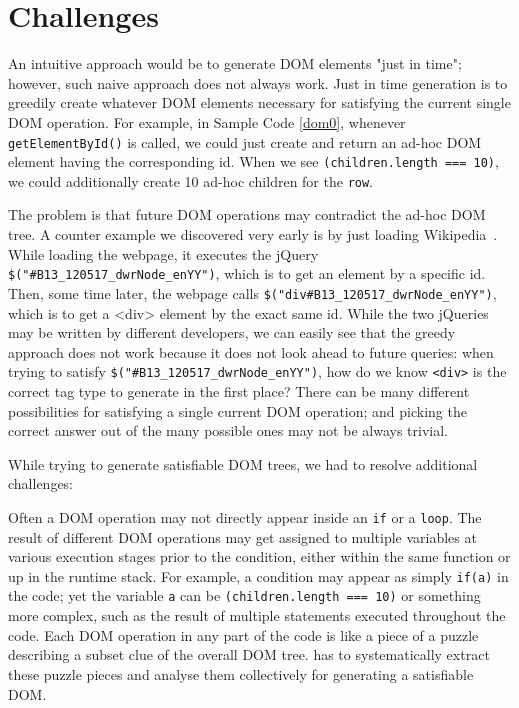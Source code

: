 \section{Challenges}
An intuitive approach would be to generate DOM elements "just in time"; however, such naive approach does not always work.  
Just in time generation is to greedily create whatever DOM elements necessary for satisfying the current single DOM operation.  
For example, in Sample Code \ref{dom0}, whenever {\tt getElementById()} is called, we could just create and return an ad-hoc DOM element having the corresponding id.  
When we see {\tt (children.length === 10)}, we could additionally create 10 ad-hoc children for the {\tt row}.  

The problem is that future DOM operations may contradict the ad-hoc DOM tree.  
A counter example we discovered very early is by just loading Wikipedia~\cite{wikipedia}.  
While loading the webpage, it executes the jQuery {\tt \$("\#B13\_120517\_dwrNode\_enYY")}, which is to get an element by a specific id.  
Then, some time later, the webpage calls {\tt \$("div\#B13\_120517\_dwrNode\_enYY")}, which is to get a <div> element by the exact same id.  
While the two jQueries may be written by different developers, we can easily see that the greedy approach does not work because it does not look ahead to future queries: when trying to satisfy {\tt \$("\#B13\_120517\_dwrNode\_enYY")}, how do we know {\tt <div>} is the correct tag type to generate in the first place?  
There can be many different possibilities for satisfying a single current DOM operation; and picking the correct answer out of the many possible ones may not be always trivial.  

While trying to generate satisfiable DOM trees, we had to resolve additional challenges:  

Often a DOM operation may not directly appear inside an {\tt if} or a {\tt loop}.  
The result of different DOM operations may get assigned to multiple variables at various execution stages prior to the condition, either within the same function or up in the runtime stack.  
For example, a condition may appear as simply {\tt if(a)} in the code; yet the variable {\tt a} can be {\tt (children.length === 10)} or something more complex, such as the result of multiple statements executed throughout the code.  
Each DOM operation in any part of the code is like a piece of a puzzle describing a subset clue of the overall DOM tree.  \tool has to systematically extract these puzzle pieces and analyse them collectively for generating a satisfiable DOM.  

